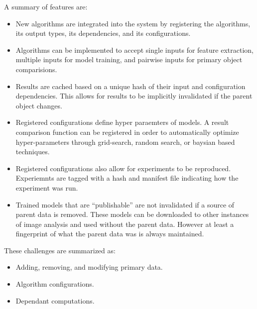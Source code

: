     A summary of \depcache{} features are:
    \begin{itemize}

        \item New algorithms are integrated into the system by
          registering the algorithms, its output types, its
          dependencies, and its configurations.

        \item Algorithms can be implemented to accept single inputs
          for feature extraction, multiple inputs for model training,
          and pairwise inputs for primary object comparisions.

        \item Results are cached based on a unique hash of their input
          and configuration dependencies.
        This allows for results to be implicitly invalidated if the
          parent object changes.

        \item Registered configurations define hyper paraemters of
          models.
        A result comparison function can be registered in order to
          automatically optimize hyper-parameters through grid-search,
          random search, or baysian based techniques.

        \item Registered configurations also allow for experiments to
          be reproduced.
        Experiemnts are tagged with a hash and manifest file
          indicating how the experiment was run.

        \item Trained models that are ``publishable'' are not
          invalidated if a source of parent data is removed.
        These models can be downloaded to other instances of image
          analysis and used without the parent data.
        However at least a fingerprint of what the parent data was is
          always maintained.

    \end{itemize}

    These challenges are summarized as:
    \begin{itemize}
        \item Adding, removing, and modifying primary data.
        \item Algorithm configurations.
        \item Dependant computations.
    \end{itemize}


